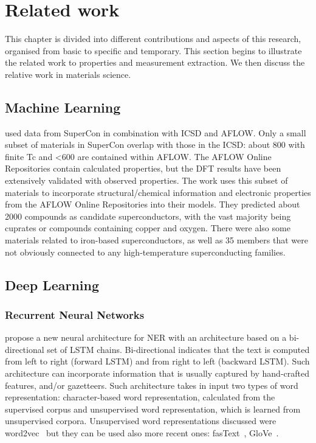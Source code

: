 \chapter{Related work}
This chapter is divided into different contributions and aspects of this research, organised from basic to specific and temporary. 
This section begins to illustrate the related work to properties and measurement extraction. We then discuss the relative work in materials science. 

\section{Machine Learning}

\cite{stanev_machine_2017} used data from SuperCon in combination with ICSD and AFLOW. 
Only a small subset of materials in SuperCon overlap with those in the ICSD: about 800 with finite Tc and <600 are contained within AFLOW. 
The AFLOW Online Repositories contain calculated properties, but the DFT results have been extensively validated with observed properties. 
The work uses this subset of materials to incorporate structural/chemical information and electronic properties from the AFLOW Online Repositories into their models. 
They predicted about 2000 compounds as candidate superconductors, with the vast majority being cuprates or compounds containing copper and oxygen. 
There were also some materials related to iron-based superconductors, as well as 35 members that were not obviously connected to any high-temperature superconducting families.


\section{Deep Learning}

\subsection{Recurrent Neural Networks}
\cite{lample2016neural} propose a new neural architecture for NER with an architecture based on a bi-directional set of LSTM chains. 
Bi-directional indicates that the text is computed from left to right (forward LSTM) and from right to left (backward LSTM). 
Such architecture can incorporate information that is usually captured by hand-crafted features, and/or gazetteers. 
Such architecture takes in input two types of word representation: character-based word representation, calculated from the supervised corpus and unsupervised word representation, which is learned from unsupervised corpora. 
Unsupervised word representations discussed were word2vec~\cite{mikolov2013efficient} but they can be used also more recent ones: fasText~\cite{joulin2016fasttext}, GloVe~\cite{pennington2014glove}.

